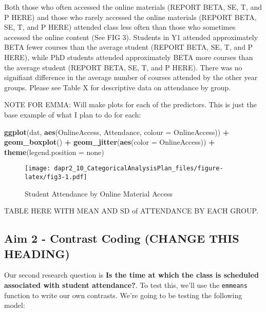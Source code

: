 \documentclass[
]{article}
\newenvironment{Shaded}{\begin{snugshade}}{\end{snugshade}}
\newcommand{\AttributeTok}[1]{\textcolor[rgb]{0.13,0.29,0.53}{#1}}
\newcommand{\FunctionTok}[1]{\textcolor[rgb]{0.13,0.29,0.53}{\textbf{#1}}}
\newcommand{\NormalTok}[1]{#1}
\newcommand{\SpecialCharTok}[1]{\textcolor[rgb]{0.81,0.36,0.00}{\textbf{#1}}}
\newcommand{\StringTok}[1]{\textcolor[rgb]{0.31,0.60,0.02}{#1}}
\begin{document}
Both those who often accessed the online materials (REPORT BETA, SE, T, and P HERE) and those who rarely accessed the online materials (REPORT BETA, SE, T, and P HERE) attended class less often than those who sometimes accessed the online content (See FIG 3).
Students in Y1 attended approximately BETA fewer courses than the average student (REPORT BETA, SE, T, and P HERE), while PhD students attended approximately BETA more courses than the average student (REPORT BETA, SE, T, and P HERE). There was no signifiant difference in the average number of courses attended by the other year groups. Please see Table X for descriptive data on attendance by group.

NOTE FOR EMMA:
Will make plots for each of the predictors. This is just the base example of what I plan to do for each:

\begin{Shaded}
\begin{Highlighting}[]
\FunctionTok{ggplot}\NormalTok{(dat, }\FunctionTok{aes}\NormalTok{(OnlineAccess, Attendance, }\AttributeTok{colour =}\NormalTok{ OnlineAccess)) }\SpecialCharTok{+} \FunctionTok{geom\_boxplot}\NormalTok{() }\SpecialCharTok{+} \FunctionTok{geom\_jitter}\NormalTok{(}\FunctionTok{aes}\NormalTok{(}\AttributeTok{color =}\NormalTok{ OnlineAccess)) }\SpecialCharTok{+}
  \FunctionTok{theme}\NormalTok{(}\AttributeTok{legend.position =} \StringTok{\textquotesingle{}none\textquotesingle{}}\NormalTok{)}
\end{Highlighting}
\end{Shaded}

\begin{figure}
\centering
\texttt{[image: dapr2\_10\_CategoricalAnalysisPlan\_files/figure-latex/fig3-1.pdf]}
\caption{\label{fig:fig3}Student Attendance by Online Material Access}
\end{figure}

TABLE HERE WITH MEAN AND SD of ATTENDANCE BY EACH GROUP.

\hypertarget{aim-2---contrast-coding-change-this-heading}{%
\subsection{Aim 2 - Contrast Coding (CHANGE THIS HEADING)}\label{aim-2---contrast-coding-change-this-heading}}

Our second research question is \textbf{Is the time at which the class is scheduled associated with student attendance?}. To test this, we'll use the \texttt{emmeans} function to write our own contrasts. We're going to be testing the following model:
\end{document}

